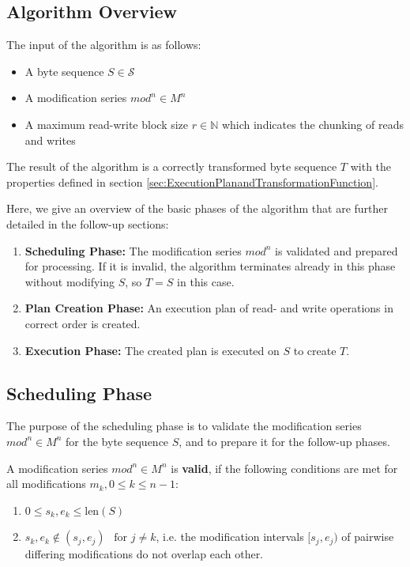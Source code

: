 \documentclass[english, 10pt, openright, twocolumn, landscape, twoside, notitlepage, a4paper, pdftex]		
{article}
\begin{document}
\subsection{Algorithm Overview}%
\label{sec:AlgorithmOverview}%

The input of the algorithm is as follows:
\begin{itemize}
\item A byte sequence $S\in\mathcal{S}$
\item A modification series $mod^{n}\in M^{n}$
\item A maximum read-write block size $r\in\mathbb{N}$ which indicates the chunking of reads and writes
\end{itemize}

The result of the algorithm is a correctly transformed byte sequence $T$ with the properties defined in section \ref{sec:ExecutionPlanandTransformationFunction}.

Here, we give an overview of the basic phases of the algorithm that are further detailed in the follow-up sections:
\begin{enumerate}
\item \textbf{Scheduling Phase:} The modification series $mod^{n}$ is validated and prepared for processing. If it is invalid, the algorithm terminates already in this phase without modifying $S$, so $T=S$ in this case.
\item \textbf{Plan Creation Phase:} An execution plan of read- and write operations in correct order is created.
\item \textbf{Execution Phase:} The created plan is executed on $S$ to create $T$.
\end{enumerate}

\subsection{Scheduling Phase}%
\label{sec:SchedulingPhase}%

The purpose of the scheduling phase is to validate the modification series $mod^{n}\in M^{n}$ for the byte sequence $S$, and to prepare it for the follow-up phases.

A modification series $mod^{n}\in M^{n}$ is \textbf{valid}, if the following conditions are met for all modifications $m_{k}, 0\leq k\leq n-1$:
\begin{enumerate}
\item $0\leq s_{k},e_{k}\leq \text{len}(S)$
\item $s_{k},e_{k}\notin(s_{j}, e_{j})\ \ \text{ for } j\neq k$, i.e. the modification intervals $[s_{j}, e_{j})$ of pairwise differing modifications do not overlap each other.
\end{enumerate}
\end{document}
